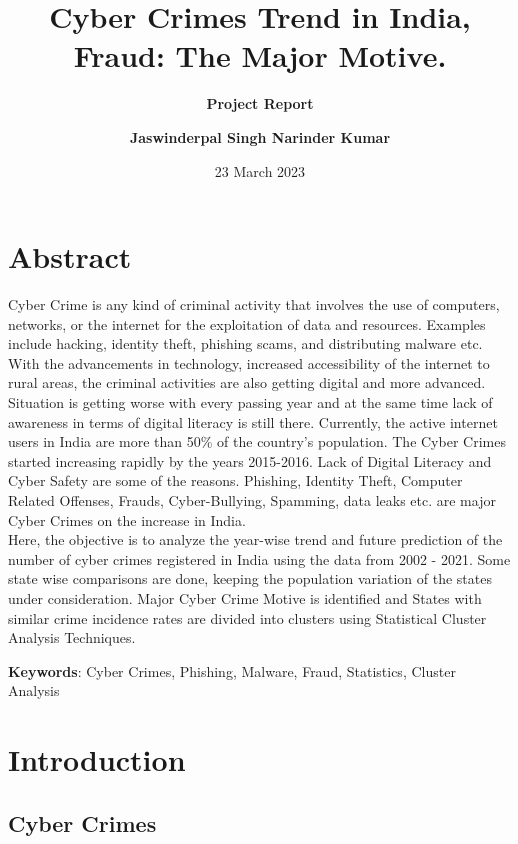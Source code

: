 \documentclass[
  12,
  a4paper,
]{report}
\title{\textbf{Cyber Crimes Trend in India, Fraud: The Major Motive.}}
\subtitle{\textbf{Project Report }}
\author{\textbf{Jaswinderpal Singh \n   Narinder Kumar}}
\date{23 March 2023}
\begin{document}
\maketitle

\hypertarget{abstract}{%
\chapter{Abstract}\label{abstract}}

Cyber Crime is any kind of criminal activity that involves the use of
computers, networks, or the internet for the exploitation of data and
resources. Examples include hacking, identity theft, phishing scams, and
distributing malware etc. With the advancements in technology, increased
accessibility of the internet to rural areas, the criminal activities
are also getting digital and more advanced.\\
Situation is getting worse with every passing year and at the same time
lack of awareness in terms of digital literacy is still there.
Currently, the active internet users in India are more than 50\% of the
country's population. The Cyber Crimes started increasing rapidly by the
years 2015-2016. Lack of Digital Literacy and Cyber Safety are some of
the reasons. Phishing, Identity Theft, Computer Related Offenses,
Frauds, Cyber-Bullying, Spamming, data leaks etc. are major Cyber Crimes
on the increase in India.\\
Here, the objective is to analyze the year-wise trend and future
prediction of the number of cyber crimes registered in India using the
data from 2002 - 2021. Some state wise comparisons are done, keeping the
population variation of the states under consideration. Major Cyber
Crime Motive is identified and States with similar crime incidence rates
are divided into clusters using Statistical Cluster Analysis Techniques.

\textbf{Keywords}: Cyber Crimes, Phishing, Malware, Fraud, Statistics,
Cluster Analysis

\hypertarget{introduction}{%
\chapter{Introduction}\label{introduction}}

\hypertarget{cyber-crimes}{%
\section{Cyber Crimes}\label{cyber-crimes}}
\end{document}
